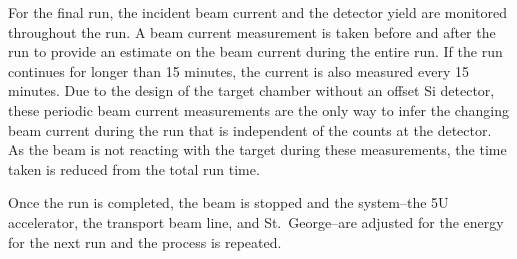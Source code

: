 For the final run, the incident beam current and the detector yield are
monitored throughout the run. A beam current measurement is taken before
and after the run to provide an estimate on the beam current during the
entire run. If the run continues for longer than 15 minutes, the current
is also measured every 15 minutes. Due to the design of the target
chamber without an offset Si detector, these periodic beam current
measurements are the only way to infer the changing beam current during
the run that is independent of the counts at the detector. As the beam
is not reacting with the target during these measurements, the time
taken is reduced from the total run time.

Once the run is completed, the beam is stopped and the system\---{}the
5U accelerator, the transport beam line, and St.\ George\---{}are
adjusted for the energy for the next run and the process is repeated.
